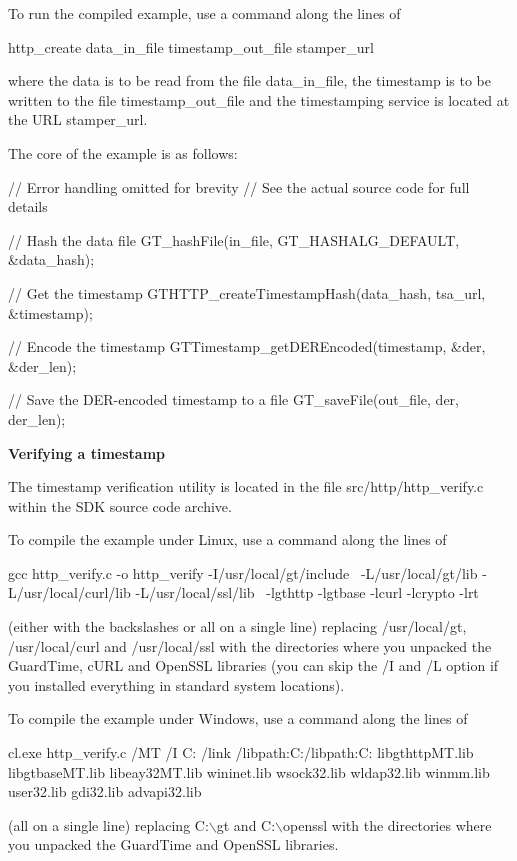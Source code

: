 To run the compiled example, use a command along the lines of 
\begin{DoxyCode}
        http_create data_in_file timestamp_out_file stamper_url
\end{DoxyCode}
 where the data is to be read from the file {\ttfamily data\_\-in\_\-file}, the timestamp is to be written to the file {\ttfamily timestamp\_\-out\_\-file} and the timestamping service is located at the URL {\ttfamily stamper\_\-url}.

The core of the example is as follows: 
\begin{DoxyCode}
        // Error handling omitted for brevity
        // See the actual source code for full details

        // Hash the data file
        GT_hashFile(in_file, GT_HASHALG_DEFAULT, &data_hash);

        // Get the timestamp
        GTHTTP_createTimestampHash(data_hash, tsa_url, &timestamp);

        // Encode the timestamp
        GTTimestamp_getDEREncoded(timestamp, &der, &der_len);

        // Save the DER-encoded timestamp to a file
        GT_saveFile(out_file, der, der_len);
\end{DoxyCode}


{\bfseries Verifying a timestamp}

The timestamp verification utility is located in the file {\ttfamily src/http/http\_\-verify.c} within the SDK source code archive.

To compile the example under Linux, use a command along the lines of 
\begin{DoxyCode}
        gcc http_verify.c -o http_verify -I/usr/local/gt/include \
        -L/usr/local/gt/lib -L/usr/local/curl/lib -L/usr/local/ssl/lib \
        -lgthttp -lgtbase -lcurl -lcrypto -lrt
\end{DoxyCode}
 (either with the backslashes or all on a single line) replacing {\ttfamily /usr/local/gt}, {\ttfamily /usr/local/curl} and {\ttfamily /usr/local/ssl} with the directories where you unpacked the GuardTime, cURL and OpenSSL libraries (you can skip the {\ttfamily /I} and {\ttfamily /L} option if you installed everything in standard system locations).

To compile the example under Windows, use a command along the lines of 
\begin{DoxyCode}
        cl.exe http_verify.c /MT /I C:\gt
        /link /libpath:C:\gt\lib /libpath:C:\openssl\lib
        libgthttpMT.lib libgtbaseMT.lib libeay32MT.lib wininet.lib
        wsock32.lib wldap32.lib winmm.lib user32.lib gdi32.lib advapi32.lib
\end{DoxyCode}
 (all on a single line) replacing {\ttfamily C:$\backslash$gt} and {\ttfamily C:$\backslash$openssl} with the directories where you unpacked the GuardTime and OpenSSL libraries.

